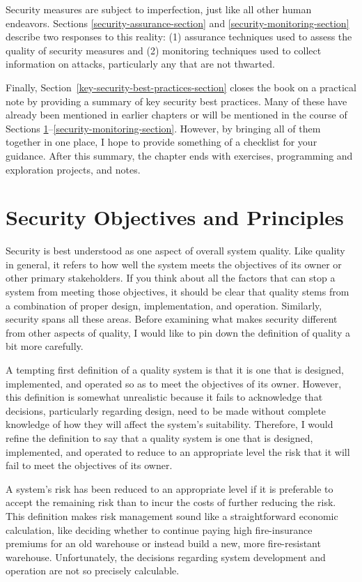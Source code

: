 Security measures are subject to imperfection, just like all other
human endeavors.  Sections \ref{security-assurance-section} and
\ref{security-monitoring-section} describe two responses to this
reality: (1) assurance techniques used to assess the quality of security
measures and (2) monitoring techniques used to collect information on
attacks, particularly any that are not thwarted.

Finally, Section~\ref{key-security-best-practices-section} closes the
book on a practical note by providing a summary of key security best
practices.  Many of these have already been mentioned in earlier
chapters or will be mentioned in the course of Sections
\ref{security-objectives-and-principles-section}--\ref{security-monitoring-section}.
However, by bringing all of them together in one place, I hope to
provide something of a checklist for your guidance.  After this
summary, the chapter ends with exercises, programming and exploration
projects, and notes.

\section{Security Objectives and
  Principles}\label{security-objectives-and-principles-section}

Security is best understood as one aspect of overall system quality.
Like quality in general, it refers to how well the system meets
the objectives of its owner or other primary stakeholders.  If you
think about all the factors that can stop a system from meeting those
objectives, it should be clear that quality stems from a combination
of proper design, implementation, and operation.  Similarly, security
spans all these areas.  Before examining what makes security different
from other aspects of quality, I would like to pin down the definition
of quality a bit more carefully.

A tempting first definition of a quality system is that it is one that
is designed, implemented, and operated so as to meet the objectives of
its owner.  However, this definition is somewhat unrealistic because
it fails to acknowledge that decisions, particularly regarding
design, need to be made without complete knowledge of how they will
affect the system's suitability.  Therefore, I would refine the definition
to say that a quality system is one that is designed, implemented, and
operated to reduce to an appropriate level the risk that it will
fail to meet the objectives of its owner.

A system's risk has been reduced to an appropriate level if it is
preferable to accept the remaining risk than to incur the costs of
further reducing the risk.  This definition makes risk management
sound like a straightforward economic calculation, like deciding
whether to continue paying high fire-insurance premiums for an old
warehouse or instead build a new, more fire-resistant warehouse.
Unfortunately, the decisions regarding system development and
operation are not so precisely calculable.

